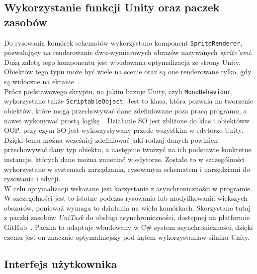\subsection{Wykorzystanie funkcji Unity oraz paczek zasobów}
\label{subsec:zasoby}

Do rysowania komórek schematów wykorzystano komponent \texttt{SpriteRenderer},
pozwalający na renderowanie dwu-wymiarowych obrazów nazywanych \textit{sprite'ami}.
Dużą zaletą tego komponentu jest wbudowana optymalizacja ze strony Unity.
Obiektów tego typu może być wiele na scenie oraz są one renderowane tylko,
gdy są widoczne na ekranie~\cite{unity_csharp, unity_docs}. \\
\indent Prócz podstawowego skryptu, na jakim bazuje Unity, czyli \texttt{MonoBehaviour},
wykorzystano także \texttt{ScriptableObject}.
Jest to klasa, która pozwala na tworzenie obiektów, które mogą przechowywać dane zdefiniowane poza pracą programu,
a nawet wykonywać prostą logikę~\cite{unity_csharp, unity_docs}.
Działanie SO jest zbliżone do klas i obiektów\linebreak w OOP,
przy czym SO jest wykorzystywany przede wszystkim w edytorze Unity.
Dzięki temu można wcześniej zdefiniować jaki rodzaj danych powinien przechowywać dany typ obiektu,
a następnie tworzyć na ich podstawie konkretne instancje, których dane można zmieniać w edytorze.
Zostało to w szczególności wykorzystane w systemach zarządzania, rysowanym schematem
i narzędziami do rysowania i edycji.\\
\indent W celu optymalizacji wskazane jest korzystanie z asynchroniczności w programie.
W szczególności jest to istotne podczas rysowania lub modyfikowania większych obszarów,
ponieważ wymaga to działania na wielu komórkach.
Skorzystano tutaj z paczki zasobów \textit{UniTask} do obsługi asynchroniczności,
dostępnej na platformie GitHub~\cite{unitask}.
Paczka ta adaptuje wbudowany w C\# system asynchroniczności,
dzięki czemu jest on znacznie optymalniejszy pod kątem wykorzystania\linebreak w silniku Unity.


\subsection{Interfejs użytkownika}
\label{subsec:interfejs_uzytkownika}

